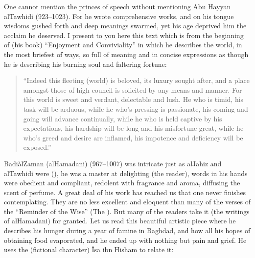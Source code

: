 \documentclass[12pt]{memoir}
\begin{document}

One cannot mention the princes of speech without mentioning
Abu Hayyan al\–Tawhidi (923–1023).
For he wrote comprehensive works, and on his tongue wisdoms gushed forth
and deep meanings swarmed, yet his age deprived him the acclaim he deserved.
I present to you here this text which is from the beginning of (his book)
“Enjoyment and Conviviality” in which he describes the world,
in the most briefest of ways, so full of meaning and in concise expressions
as though he is describing his burning soul and faltering fortune:

\begin{quote}
“Indeed this fleeting (world) is beloved, its luxury sought after,
and a place amongst those of high council is solicited by any means and manner.
For this world is sweet and verdant, delectable and lush.
He who is timid, his task will be arduous,
while he who’s pressing is passionate,
his coming and going will advance continually,
while he who is held captive by his expectations,
his hardship will be long and his misfortune great,
while he who’s greed and desire are inflamed,
his impotence and deficiency will be exposed.”\fnmark
\end{quote}


Badi\` al\–Zaman (al\–Hamadani) (967–1007) was intricate
just as al\–Jahiz and al\–Tawhidi were
(),
he was a master at delighting (the reader),
words in his hands were obedient and compliant,
redolent with fragrance and aroma, diffusing the scent of perfume.
A great deal of his work has reached us that one never finishes contemplating.
They are no less excellent and eloquent than many of the verses
of the “Reminder of the Wise” (The \Quran).
But many of the readers take it (the writings of al\–Hamadani) for granted.
Let us read this beautiful artistic piece where
he describes his hunger during a year of famine in Baghdad,
and how all his hopes of obtaining food evaporated,
and he ended up with nothing but pain and grief.
He uses the (fictional character) \`Isa ibn Hisham to relate it:
\end{document}
